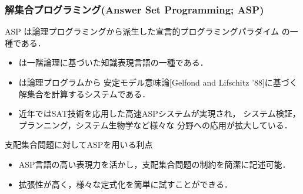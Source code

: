 \documentclass[dvipdfmx,10pt]{beamer}
\begin{document}
\begin{frame}\frametitle{解集合プログラミング(Answer Set Programming; ASP)}
  \begin{block}{}\centering
    ASP は論理プログラミングから派生した宣言的プログラミングパラダイム
    の一種である．
  \end{block}
  \vfill
  \begin{itemize}
  \item {}は一階論理に基づいた知識表現言語の一種である．
  \item {}は論理プログラムから
	安定モデル意味論[Gelfond and Lifschitz '88]に基づく
	解集合を計算するシステムである．
  \item 近年ではSAT技術を応用した高速ASPシステムが実現され，
	システム検証，プランニング，システム生物学など様々な
	分野への応用が拡大している．
 \end{itemize}
 \begin{alertblock}{支配集合問題に対してASPを用いる利点}
  \begin{itemize}
   \item ASP言語の高い表現力を活かし，支配集合問題の制約を簡潔に記述可能．
   \item 拡張性が高く，様々な定式化を簡単に試すことができる．
  \end{itemize}
 \end{alertblock}
\end{frame}
 
%
%
\end{document}
